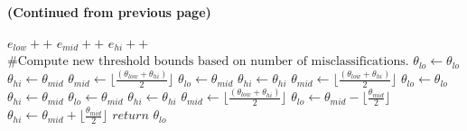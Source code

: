 \documentclass[11pt]{article}
\begin{document}
	\begin{algorithm}
	\center \textbf{(Continued from previous page)}
	\begin{algorithmic}
	\State $e_{low}++$
	\State $e_{mid}++$
	\Else {}
	\State $e_{hi}++$
	\EndIf
	\EndIf
	\EndFor
	\State $\text{\#Compute new threshold bounds based on number of misclassifications.}$
	\State $\theta_{lo} \gets \theta_{lo}$
	\State $\theta_{hi} \gets \theta_{mid}$
	\State $\theta_{mid} \gets \lfloor\frac{(\theta_{low} + \theta_{hi})}{2}\rfloor$
	\State $\theta_{lo} \gets \theta_{mid}$
	\State $\theta_{hi} \gets \theta_{hi}$
	\State $\theta_{mid} \gets \lfloor\frac{(\theta_{low} + \theta_{hi})}{2}\rfloor$
	\State $\theta_{lo} \gets \theta_{lo}$
	\State $\theta_{hi} \gets \theta_{mid}$
	\Else {}
	\State $\theta_{lo} \gets \theta_{mid}$
	\State $\theta_{hi} \gets \theta_{hi}$
	\EndIf
	\State $\theta_{mid} \gets \lfloor\frac{(\theta_{low} + \theta_{hi})}{2}\rfloor$
	\State $\theta_{lo} \gets \theta_{mid} - \lfloor\frac{\theta_{mid}}{2}\rfloor$
	\State $\theta_{hi} \gets \theta_{mid} + \lfloor\frac{\theta_{mid}}{2}\rfloor$
	\EndIf
	\EndWhile
	\State $\textit{return $\theta_{lo}$}$
  	\EndProcedure
  	\end{algorithmic}
	\end{algorithm}
\end{document}
